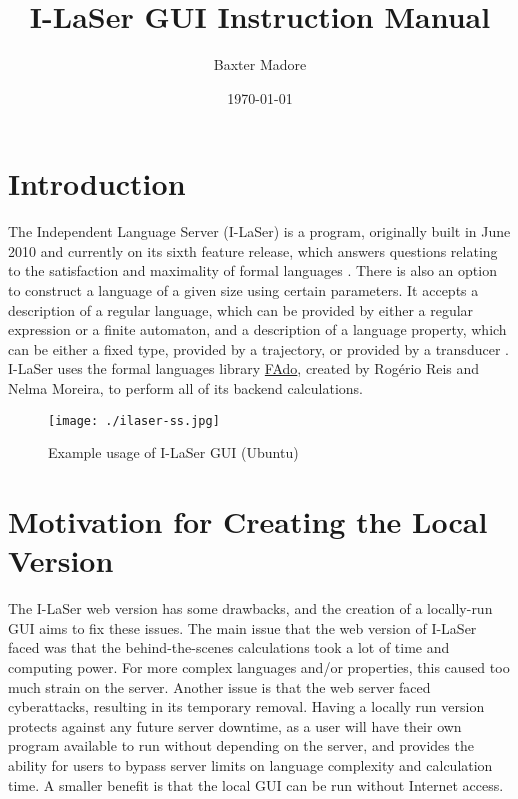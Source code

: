 \documentclass{article}
\title{I-LaSer GUI Instruction Manual}
\author{Baxter Madore}
\date{\today}
\begin{document}
\maketitle
\tableofcontents

\section{Introduction}
\par The Independent Language Server (I-LaSer) is a program, originally built in June 2010 and currently on its sixth feature release, which answers questions relating to the satisfaction and maximality of formal languages \cite{Properties}. There is also an option to construct a language of a given size using certain parameters. It accepts a description of a regular language, which can be provided by either a regular expression or a finite automaton, and a description of a language property, which can be either a fixed type, provided by a trajectory, or provided by a transducer \cite{LaSer}.
I-LaSer uses the formal languages library \href{https://fado.dcc.fc.up.pt/}{FAdo}\cite{FAdo}, created by Rogério Reis and Nelma Moreira, to perform all of its backend calculations.

\begin{center}
\begin{figure}[htb]
\texttt{[image: ./ilaser-ss.jpg]}
\caption{Example usage of I-LaSer GUI (Ubuntu)}
\end{figure}
\end{center}

\section{Motivation for Creating the Local Version}
\par The I-LaSer web version has some drawbacks, and the creation of a locally-run GUI aims to fix these issues.
The main issue that the web version of I-LaSer faced was that the behind-the-scenes calculations took a lot of time and computing power. For more complex languages and/or properties, this caused too much strain on the server. Another issue is that the web server faced cyberattacks, resulting in its temporary removal. Having a locally run version protects against any future server downtime, as a user will have their own program available to run without depending on the server, and provides the ability for users to bypass server limits on language complexity and calculation time. A smaller benefit is that the local GUI can be run without Internet access. 
\end{document}
